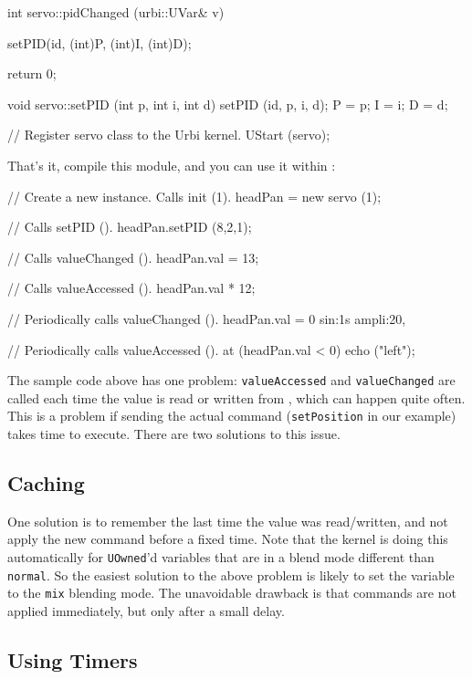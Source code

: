 \begin{cxx}
int
servo::pidChanged (urbi::UVar& v)
{
  setPID(id, (int)P, (int)I, (int)D);

  return 0;
}

void
servo::setPID (int p, int i, int d)
{
  setPID (id, p, i, d);
  P = p;
  I = i;
  D = d;
}

// Register servo class to the Urbi kernel.
UStart (servo);
\end{cxx}

That's it, compile this module, and you can use it within \us:

\begin{urbiunchecked}
// Create a new instance.  Calls init (1).
headPan = new servo (1);

// Calls setPID ().
headPan.setPID (8,2,1);

// Calls valueChanged ().
headPan.val = 13;

// Calls valueAccessed ().
headPan.val * 12;

// Periodically calls valueChanged ().
headPan.val = 0 sin:1s ampli:20,

// Periodically calls valueAccessed ().
at (headPan.val < 0)
  echo ("left");
\end{urbiunchecked}

The sample code above has one problem: \lstinline{valueAccessed} and
\lstinline{valueChanged} are called each time the value is read or
written from \urbi, which can happen quite often. This is a problem if
sending the actual command (\lstinline{setPosition} in our example)
takes time to execute. There are two solutions to this issue.

\subsection{Caching}

One solution is to remember the last time the value was read/written,
and not apply the new command before a fixed time. Note that the
kernel is doing this automatically for \lstinline{UOwned}'d variables
that are in a blend mode different than \lstinline{normal}. So the
easiest solution to the above problem is likely to set the variable to
the \lstinline{mix} blending mode. The unavoidable drawback is that
commands are not applied immediately, but only after a small delay.

\subsection{Using Timers}

